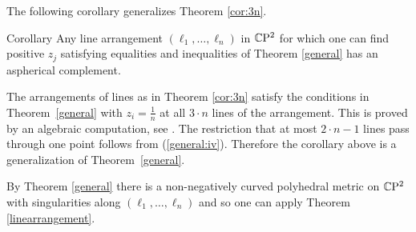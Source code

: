 \documentclass[oneside,a4paper]{article}
\begin{document}
The following corollary generalizes Theorem \ref{cor:3n}.

\begin{thm}{Corollary}\label{generalarrangement}
Any line arrangement $(\ell_1,\dots,\ell_n)$ in $\mathbb{C}\mathrm{P}^2$
for which one can find positive $z_j$ satisfying equalities and inequalities
of Theorem  \ref{general} has an aspherical complement.
\end{thm}

The arrangements of lines
as in Theorem \ref{cor:3n}
satisfy the conditions in Theorem~\ref{general}
with $z_i =\tfrac1n$
at all $3\cdot n$ lines of the arrangement. 
This is proved by an algebraic computation, see \cite[Corollary 7.8]{panov}.
The restriction that at most $2\cdot n-1$ lines pass through one point
follows from (\ref{general:iv}).
Therefore the corollary above is a generalization of  Theorem~\ref{general}.

By Theorem \ref{general} there is a non-negatively curved polyhedral metric on
$\mathbb{C}\mathrm{P}^2$ with singularities along $(\ell_1,\dots,\ell_n)$ and so one can apply Theorem \ref{linearrangement}.
\qeds
\end{document}
